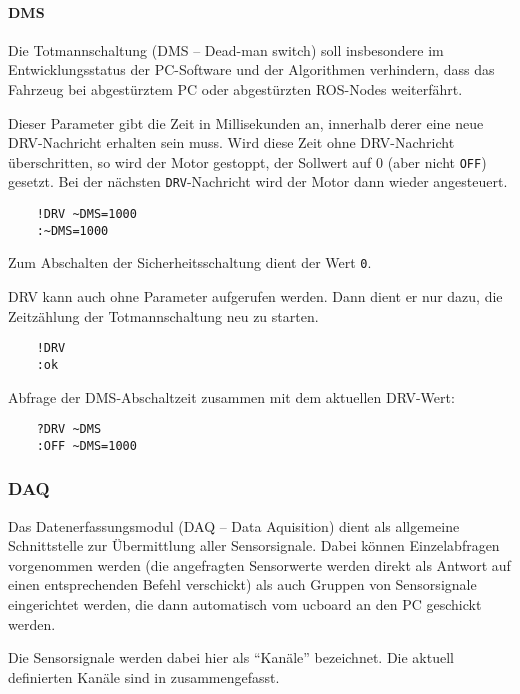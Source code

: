 \paragraph{DMS}

Die Totmannschaltung (DMS -- Dead-man switch) soll insbesondere im Entwicklungsstatus der PC-Software und der Algorithmen verhindern, dass das Fahrzeug bei abgestürztem PC oder abgestürzten ROS-Nodes weiterfährt.

Dieser Parameter gibt die Zeit in Millisekunden an, innerhalb derer eine neue DRV-Nachricht erhalten sein muss. Wird diese Zeit ohne DRV-Nachricht überschritten, so wird der Motor gestoppt, \dah der Sollwert auf 0 (aber nicht \texttt{OFF}) gesetzt. Bei der nächsten \texttt{DRV}-Nachricht wird der Motor dann wieder angesteuert.

\begin{verbatim}
	!DRV ~DMS=1000
	:~DMS=1000
\end{verbatim}
Zum Abschalten der Sicherheitsschaltung dient der Wert \texttt{0}.

DRV kann auch ohne Parameter aufgerufen werden. Dann dient er nur dazu, die Zeitzählung der Totmannschaltung neu zu starten.

\begin{verbatim}
	!DRV
	:ok
\end{verbatim}

Abfrage der DMS-Abschaltzeit zusammen mit dem aktuellen DRV-Wert:
\begin{verbatim}
	?DRV ~DMS
	:OFF ~DMS=1000
\end{verbatim}



\subsubsection{DAQ}

Das Datenerfassungsmodul (DAQ -- Data Aquisition) dient als allgemeine Schnittstelle zur Übermittlung aller Sensorsignale. Dabei können Einzelabfragen vorgenommen werden (die angefragten Sensorwerte werden direkt als Antwort auf einen entsprechenden Befehl verschickt) als auch Gruppen von Sensorsignale eingerichtet werden, die dann automatisch vom ucboard an den PC geschickt werden.

Die Sensorsignale werden dabei hier als "`Kanäle"' bezeichnet. Die aktuell definierten Kanäle sind in  zusammengefasst.


